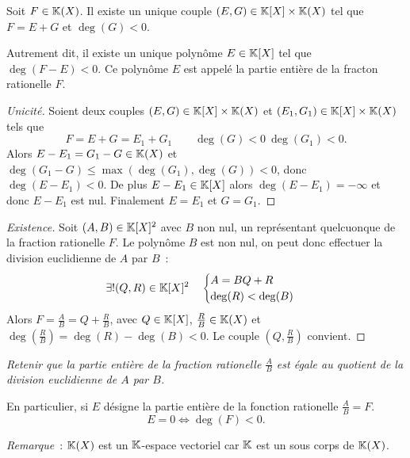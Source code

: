 \begin{theo}
  Soit $F \in \mathbb{K}(X)$. Il existe un unique couple $(E,G) \in \mathbb{K}[X]\times\mathbb{K}(X)$ tel que $F=E+G$ et $\deg(G)<0$.

  Autrement dit, il existe un unique polynôme $E \in \mathbb{K}[X]$ tel que $\deg(F-E)<0$. Ce polynôme $E$ est appelé la partie entière de la fracton rationelle $F$.
\end{theo}
\begin{proof}[Unicité]
  Soient deux couples $(E,G) \in \mathbb{K}[X]\times\mathbb{K}(X)$ et $(E_1,G_1) \in \mathbb{K}[X]\times\mathbb{K}(X)$ tels que
  \begin{equation}
    F=E+G=E_1+G_1 \qquad \deg(G)<0 \ \deg(G_1)<0.
  \end{equation}
  Alors $E-E_1=G_1-G \in \mathbb{K}(X)$ et $\deg(G_1-G)\leq \max(\deg(G_1),\deg(G))<0$, donc $\deg(E-E_1)<0$. De plus $E-E_1 \in \mathbb{K}[X]$ alors $\deg(E-E_1)=-\infty$ et donc $E-E_1$ est nul. Finalement $E=E_1$ et $G=G_1$.
\end{proof}
\begin{proof}[Existence]
  Soit $(A,B) \in \mathbb{K}[X]^2$ avec $B$ non nul, un représentant quelcuonque de la fraction rationelle $F$. Le polynôme $B$ est non nul, on peut donc effectuer la division euclidienne de $A$ par $B$~:
  \begin{equation}
    \exists! (Q,R) \in \mathbb{K}[X]^2 \quad \begin{cases} A=BQ+R \\ \deg(R) < \deg(B) \end{cases}
  \end{equation}
  Alors $F=\frac{A}{B}=Q+\frac{R}{B}$, avec $Q \in \mathbb{K}[X]$, $\frac{R}{B} \in \mathbb{K}(X)$ et $\deg\left(\frac{R}{B}\right)=\deg(R)-\deg(B)<0$. Le couple $(Q,\frac{R}{B})$ convient.
\end{proof}

\emph{Retenir que la partie entière de la fraction rationelle $\frac{A}{B}$ est égale au quotient de la division euclidienne de $A$ par $B$.}

En particulier, si $E$ désigne la partie entière de la fonction rationelle $\frac{A}{B}=F$.
\begin{equation}
  E=0 \iff \deg(F) <0.
\end{equation}

\emph{Remarque}~: $\mathbb{K}(X)$ est un $\mathbb{K}$-espace vectoriel car $\mathbb{K}$ est un sous corps de $\mathbb{K}(X)$.

